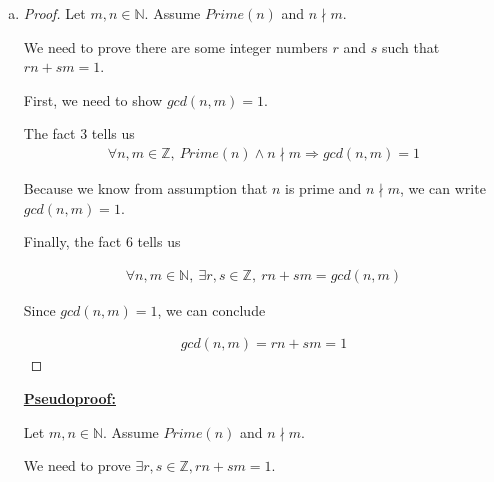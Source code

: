 \documentclass[12pt]{article}
\begin{document}
\begin{enumerate}[a.]
    \item

    \bigskip

    \begin{proof}
        Let $m,n \in \mathbb{N}$. Assume $Prime(n)$ and $n \nmid m$.

        \bigskip

        We need to prove there are some integer numbers $r$ and $s$ such that $rn + sm = 1$.

        \bigskip

        First, we need to show $gcd(n,m) = 1$.

        \bigskip

        The fact 3 tells us
        \setcounter{equation}{0}
        \begin{align}
            \forall n,m \in \mathbb{Z},\:Prime(n) \land n \nmid m \Rightarrow gcd(n,m) = 1
        \end{align}

        \bigskip

        Because we know from assumption that $n$ is prime and $n \nmid m$, we can write
        $gcd(n,m) = 1$.

        \bigskip

        Finally, the fact 6 tells us

        \begin{align}
            \forall n,m \in \mathbb{N},\:\exists r,s \in \mathbb{Z},\:rn + sm = gcd(n,m)
        \end{align}

        \bigskip

        Since $gcd(n,m) = 1$, we can conclude

        \begin{align}
            gcd(n,m) = rn + sm  = 1
        \end{align}

    \end{proof}

    \bigskip

    \begin{mdframed}

    \underline{\textbf{Pseudoproof:}}

    \bigskip

    Let $m,n \in \mathbb{N}$. Assume $Prime(n)$ and $n \nmid m$.

    \bigskip

    We need to prove $\exists r,s \in \mathbb{Z}, rn + sm = 1$.


\end{mdframed}
\end{enumerate}
\end{document}
